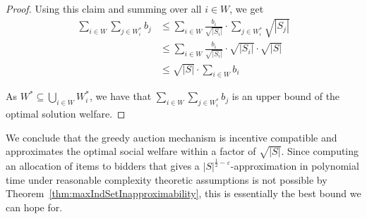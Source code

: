 \begin{proof}
				Using this claim and summing over all $i \in W$, we get
				\begin{equation*}
					\begin{split}
						\sum_{i \in W} \sum_{j \in W^*_i} b_j & \le \sum_{i \in W}
						\frac{b_i}{\sqrt{|S_i|}} \cdot \sum_{j \in W^*_i}
						\sqrt{|S_j|} \\
						& \le \sum_{i \in W} \frac{b_i}{\sqrt{|S_i|}}
						\cdot \sqrt{|S_i|} \cdot \sqrt{|S|} \\
						& \le \sqrt{|S|} \cdot \sum_{i \in W} b_i
					\end{split}
				\end{equation*}

				As $W^* \subseteq \bigcup_{i \in W} W^*_i$, we have that
				$\sum_{i \in W} \sum_{j \in W^*_i} b_j$ is an upper bound of
				the optimal solution welfare.
			\end{proof}

			We conclude that the greedy auction mechanism is incentive
			compatible and approximates the optimal social welfare within a
			factor of $\sqrt{|S|}$. Since computing an allocation of items to
			bidders that gives a $|S|^{\frac{1}{2} -
			\varepsilon}$-approximation in polynomial time under reasonable
			complexity theoretic assumptions is not possible by
			Theorem~\ref{thm:maxIndSetInapproximability}, this is essentially
			the best bound we can hope for.

